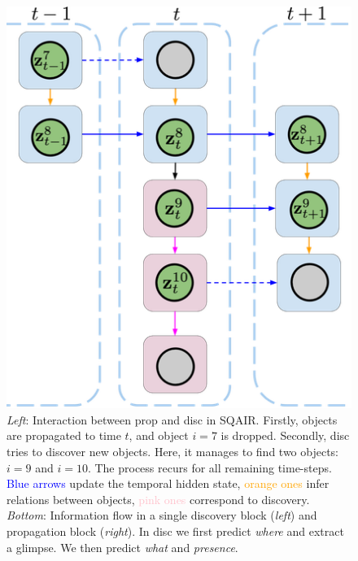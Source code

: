 \begin{figure}
    \centering
    \begin{minipage}[c]{0.49\linewidth}
        \includegraphics[width=\linewidth]{figures/SQAIR/diagrams/sqair_flow_plus_prop_simple}
    \end{minipage}
    \hfill
    \begin{minipage}[c]{0.49\linewidth}
    \caption{
        \textit{Left}:
            Interaction between \gls{prop} and \gls{disc} in \gls{SQAIR}.
            Firstly, objects are propagated to time $t$, and object $i=7$ is dropped.
            Secondly, \gls{disc} tries to discover new objects.
            Here, it manages to find two objects: $i=9$ and $i=10$.
            The process recurs for all remaining time-steps.
            \textcolor{blue}{Blue arrows} update the temporal hidden state, \textcolor{orange}{orange ones} infer relations between objects, \textcolor{pink}{pink ones} correspond to discovery.
        \textit{Bottom}:
            Information flow in a single discovery block (\textit{left}) and propagation block (\textit{right}). 
            In \gls{disc} we first predict \textit{where} and extract a glimpse. We then predict \textit{what} and \textit{presence}.
}
\end{minipage}
\end{figure}
